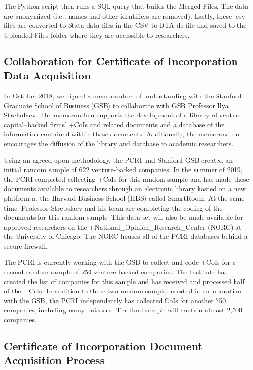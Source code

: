 \documentclass[
]{book}
\begin{document}
The Python script then runs a SQL query that builds the Merged Files. The data are anonymized (i.e., names and other identifiers are removed). Lastly, these .csv files are converted to Stata data files in the CSV to DTA do-file and saved to the Uploaded Files folder where they are accessible to researchers.

\hypertarget{collaboration-for-certificate-of-incorporation-data-acquisition}{%
\subsection{Collaboration for Certificate of Incorporation Data Acquisition}\label{collaboration-for-certificate-of-incorporation-data-acquisition}}

In October 2018, we signed a memorandum of understanding with the Stanford Graduate School of Business (GSB) to collaborate with GSB Professor Ilya Strebulaev. The memorandum supports the development of a library of venture capital--backed firms' +CoIs\textbar{} and related documents and a database of the information contained within these documents. Additionally, the memorandum encourages the diffusion of the library and database to academic researchers.

Using an agreed-upon methodology, the PCRI and Stanford GSB created an initial random sample of 622 venture-backed companies. In the summer of 2019, the PCRI completed collecting +CoIs\textbar{} for this random sample and has made these documents available to researchers through an electronic library hosted on a new platform at the Harvard Business School (HBS) called SmartRoom. At the same time, Professor Strebulaev and his team are completing the coding of the documents for this random sample. This data set will also be made available for approved researchers on the +National\_Opinion\_Research\_Center\textbar{} (NORC) at the University of Chicago. The NORC houses all of the PCRI databases behind a secure firewall.

The PCRI is currently working with the GSB to collect and code +CoIs\textbar{} for a second random sample of 250 venture-backed companies. The Institute has created the list of companies for this sample and has received and processed half of the +CoIs\textbar. In addition to these two random samples created in collaboration with the GSB, the PCRI independently has collected CoIs for another 750 companies, including many unicorns. The final sample will contain almost 2,500 companies.

\hypertarget{certificate-of-incorporation-document-acquisition-process}{%
\subsection{Certificate of Incorporation Document Acquisition Process}\label{certificate-of-incorporation-document-acquisition-process}}
\end{document}
